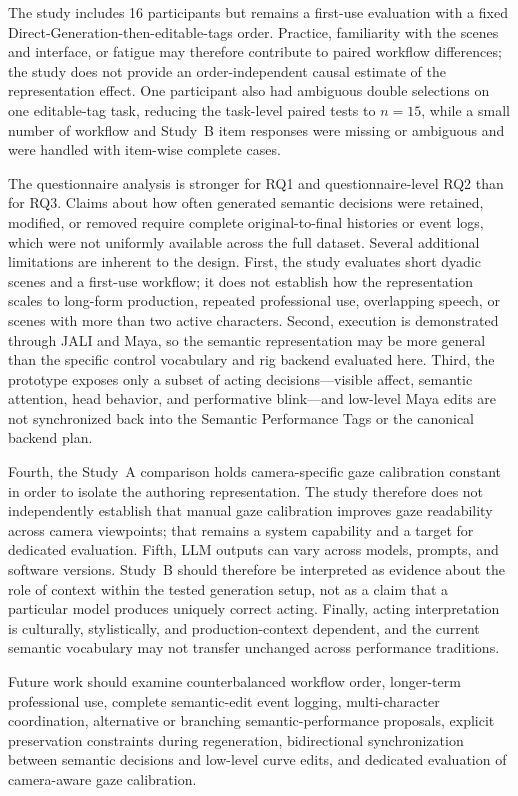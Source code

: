The study includes 16 participants but remains a first-use evaluation with a fixed Direct-Generation-then-editable-tags order. Practice, familiarity with the scenes and interface, or fatigue may therefore contribute to paired workflow differences; the study does not provide an order-independent causal estimate of the representation effect. One participant also had ambiguous double selections on one editable-tag task, reducing the task-level paired tests to $n=15$, while a small number of workflow and Study~B item responses were missing or ambiguous and were handled with item-wise complete cases.

The questionnaire analysis is stronger for RQ1 and questionnaire-level RQ2 than for RQ3. Claims about how often generated semantic decisions were retained, modified, or removed require complete original-to-final histories or event logs, which were not uniformly available across the full dataset. Several additional limitations are inherent to the design. First, the study evaluates short dyadic scenes and a first-use workflow; it does not establish how the representation scales to long-form production, repeated professional use, overlapping speech, or scenes with more than two active characters. Second, execution is demonstrated through JALI and Maya, so the semantic representation may be more general than the specific control vocabulary and rig backend evaluated here. Third, the prototype exposes only a subset of acting decisions---visible affect, semantic attention, head behavior, and performative blink---and low-level Maya edits are not synchronized back into the Semantic Performance Tags or the canonical backend plan.

Fourth, the Study~A comparison holds camera-specific gaze calibration constant in order to isolate the authoring representation. The study therefore does not independently establish that manual gaze calibration improves gaze readability across camera viewpoints; that remains a system capability and a target for dedicated evaluation. Fifth, LLM outputs can vary across models, prompts, and software versions. Study~B should therefore be interpreted as evidence about the role of context within the tested generation setup, not as a claim that a particular model produces uniquely correct acting. Finally, acting interpretation is culturally, stylistically, and production-context dependent, and the current semantic vocabulary may not transfer unchanged across performance traditions.

Future work should examine counterbalanced workflow order, longer-term professional use, complete semantic-edit event logging, multi-character coordination, alternative or branching semantic-performance proposals, explicit preservation constraints during regeneration, bidirectional synchronization between semantic decisions and low-level curve edits, and dedicated evaluation of camera-aware gaze calibration.

